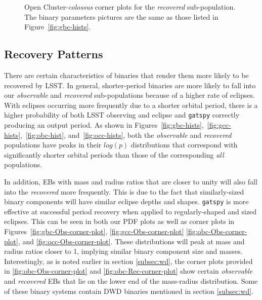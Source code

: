 \documentclass[twocolumn]{aastex63}
\begin{document}
\begin{figure*}[p]
    \centering
    \caption{Open Cluster-\textit{colossus} corner plots for the \textit{recovered} sub-population. The binary parameters pictures are the same as those listed in Figure~\ref{fig:gbc-hists}.}
    \label{fig:occ-Rec-corner-plot}
\end{figure*}


\subsection{Recovery Patterns}
\label{subsec:recovery-patterns}
There are certain characteristics of binaries that render them more likely to be recovered by LSST. In general, shorter-period binaries are more likely to fall into our \textit{observable} and \textit{recovered} sub-populations because of a higher rate of eclipses. With eclipses occurring more frequently due to a shorter orbital period, there is a higher probability of both LSST observing and eclipse and \texttt{gatspy} correctly producing an output period. As shown in Figures~\ref{fig:gbc-hists},~\ref{fig:gcc-hists},~\ref{fig:obc-hist}, and~\ref{fig:occ-hists}, both the \textit{observable} and \textit{recovered} populations have peaks in their $log(p)$ distributions that correspond with significantly shorter orbital periods than those of the corresponding \textit{all} populations.

In addition, EBs with mass and radius ratios that are closer to unity will also fall into the \textit{recovered} more frequently. This is due to the fact that similarly-sized binary components will have similar eclipse depths and shapes. \texttt{gatspy} is more effective at successful period recovery when applied to regularly-shaped and sized eclipses. This can be seen in both our PDF plots as well as corner plots in Figures~\ref{fig:gbc-Obs-corner-plot}, \ref{fig:gcc-Obs-corner-plot} \ref{fig:obc-Obs-corner-plot}, and \ref{fig:occ-Obs-corner-plot}. These distributions will peak at mass and radius ratios closer to 1, implying similar binary component size and masses. Interestingly, as is noted earlier in section \ref{subsec:wd}, the corner plots provided in \ref{fig:obc-Obs-corner-plot} and \ref{fig:obc-Rec-corner-plot} show certain \textit{observable} and \textit{recovered} EBs that lie on the lower end of the mass-radius distribution. Some of these binary systems contain DWD binaries mentioned in section \ref{subsec:wd}.
\end{document}
